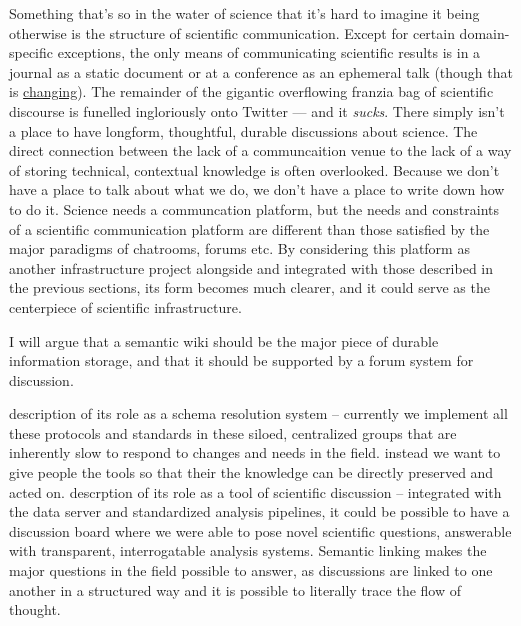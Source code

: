 \documentclass[nohyper]{tufte-book-jls}
\begin{document}
Something that's so in the water of science that it's hard to imagine it
being otherwise is the structure of scientific communication. Except for
certain domain-specific exceptions, the only means of communicating
scientific results is in a journal as a static document or at a
conference as an ephemeral talk (though that is
\href{https://neuromatch.io/conference}{changing}). The remainder of the
gigantic overflowing franzia bag of scientific discourse is funelled
ingloriously onto Twitter --- and it \emph{sucks}. There simply isn't a place to have
longform, thoughtful, durable discussions about science. The direct
connection between the lack of a communcaition venue to the lack of a
way of storing technical, contextual knowledge is often overlooked.
Because we don't have a place to talk about what we do, we don't have a
place to write down how to do it. Science needs a communcation platform,
but the needs and constraints of a scientific communication platform are
different than those satisfied by the major paradigms of chatrooms,
forums etc. By considering this platform as another infrastructure
project alongside and integrated with those described in the previous
sections, its form becomes much clearer, and it could serve as the
centerpiece of scientific infrastructure.

I will argue that a semantic wiki should be the major piece of durable
information storage, and that it should be supported by a forum system
for discussion.

\begin{leftbar}
description of its role as a schema resolution system -- currently we
implement all these protocols and standards in these siloed, centralized
groups that are inherently slow to respond to changes and needs in the
field. instead we want to give people the tools so that their the
knowledge can be directly preserved and acted on. descrption of its role
as a tool of scientific discussion -- integrated with the data server
and standardized analysis pipelines, it could be possible to have a
discussion board where we were able to pose novel scientific questions,
answerable with transparent, interrogatable analysis systems. Semantic
linking makes the major questions in the field possible to answer, as
discussions are linked to one another in a structured way and it is
possible to literally trace the flow of thought.
\end{leftbar}
\end{document}
